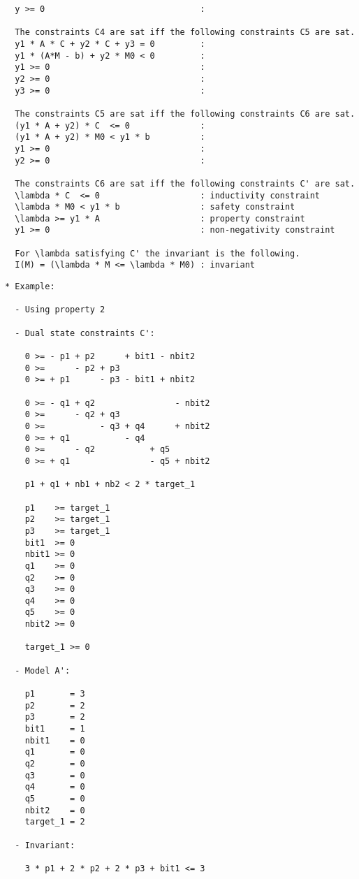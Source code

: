 \begin{verbatim}
  y >= 0                               : 

  The constraints C4 are sat iff the following constraints C5 are sat.
  y1 * A * C + y2 * C + y3 = 0         : 
  y1 * (A*M - b) + y2 * M0 < 0         : 
  y1 >= 0                              : 
  y2 >= 0                              : 
  y3 >= 0                              : 

  The constraints C5 are sat iff the following constraints C6 are sat.
  (y1 * A + y2) * C  <= 0              : 
  (y1 * A + y2) * M0 < y1 * b          : 
  y1 >= 0                              : 
  y2 >= 0                              : 

  The constraints C6 are sat iff the following constraints C' are sat.
  \lambda * C  <= 0                    : inductivity constraint
  \lambda * M0 < y1 * b                : safety constraint
  \lambda >= y1 * A                    : property constraint
  y1 >= 0                              : non-negativity constraint

  For \lambda satisfying C' the invariant is the following.
  I(M) = (\lambda * M <= \lambda * M0) : invariant
\end{verbatim}

\newpage

\begin{verbatim}
* Example:
  
  - Using property 2

  - Dual state constraints C':

    0 >= - p1 + p2      + bit1 - nbit2
    0 >=      - p2 + p3
    0 >= + p1      - p3 - bit1 + nbit2

    0 >= - q1 + q2                - nbit2
    0 >=      - q2 + q3
    0 >=           - q3 + q4      + nbit2
    0 >= + q1           - q4
    0 >=      - q2           + q5
    0 >= + q1                - q5 + nbit2

    p1 + q1 + nb1 + nb2 < 2 * target_1

    p1    >= target_1
    p2    >= target_1
    p3    >= target_1
    bit1  >= 0
    nbit1 >= 0
    q1    >= 0
    q2    >= 0
    q3    >= 0
    q4    >= 0
    q5    >= 0
    nbit2 >= 0

    target_1 >= 0

  - Model A':

    p1       = 3
    p2       = 2
    p3       = 2
    bit1     = 1
    nbit1    = 0
    q1       = 0
    q2       = 0
    q3       = 0
    q4       = 0
    q5       = 0
    nbit2    = 0
    target_1 = 2
    
  - Invariant:

    3 * p1 + 2 * p2 + 2 * p3 + bit1 <= 3

\end{verbatim}

